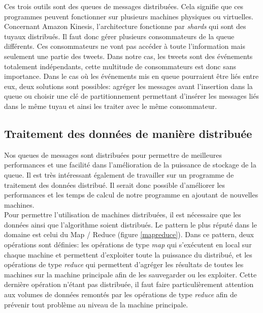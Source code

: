   Ces trois outils sont des queues de messages distribuées. Cela signifie que ces programmes peuvent fonctionner sur plusieurs machines physiques ou virtuelles. Concernant Amazon Kinesis, l'architecture fonctionne par \textit{shards} qui sont des tuyaux distribués. Il faut donc gérer plusieurs consommateurs de la queue différents. Ces consommateurs ne vont pas accéder à toute l'information mais seulement une partie des tweets. Dans notre cas, les tweets sont des événements totalement indépendants, cette multitude de consommateurs est donc sans importance. Dans le cas où les événements mis en queue pourraient être liés entre eux, deux solutions sont possibles: agréger les messages avant l'insertion dans la queue ou choisir une clé de partitionnement permettant d'insérer les messages liés dans le même tuyau et ainsi les traiter avec le même consommateur.

\subsection{Traitement des données de manière distribuée}
\label{sub:Traitement des données de manière distribuée}

  Nos queues de messages sont distribuées pour permettre de meilleures performances et une facilité dans l'amélioration de la puissance de stockage de la queue. Il est très intéressant également de travailler sur un programme de traitement des données distribué. Il serait donc possible d'améliorer les performances et les temps de calcul de notre programme en ajoutant de nouvelles machines.\\

  Pour permettre l'utilisation de machines distribuées, il est nécessaire que les données ainsi que l'algorithme soient distribués. Le pattern le plus réputé dans le domaine est celui du Map / Reduce (figure \ref{mapreduce}). Dans ce pattern, deux opérations sont définies: les opérations de type \textit{map} qui s'exécutent en local sur chaque machine et permettent d'exploiter toute la puissance du distribué, et les opérations de type \textit{reduce} qui permettent d'agréger les résultats de toutes les machines sur la machine principale afin de les sauvegarder ou les exploiter. Cette dernière opération n'étant pas distribuée, il faut faire particulièrement attention aux volumes de données remontés par les opérations de type \textit{reduce} afin de prévenir tout problème au niveau de la machine principale.

